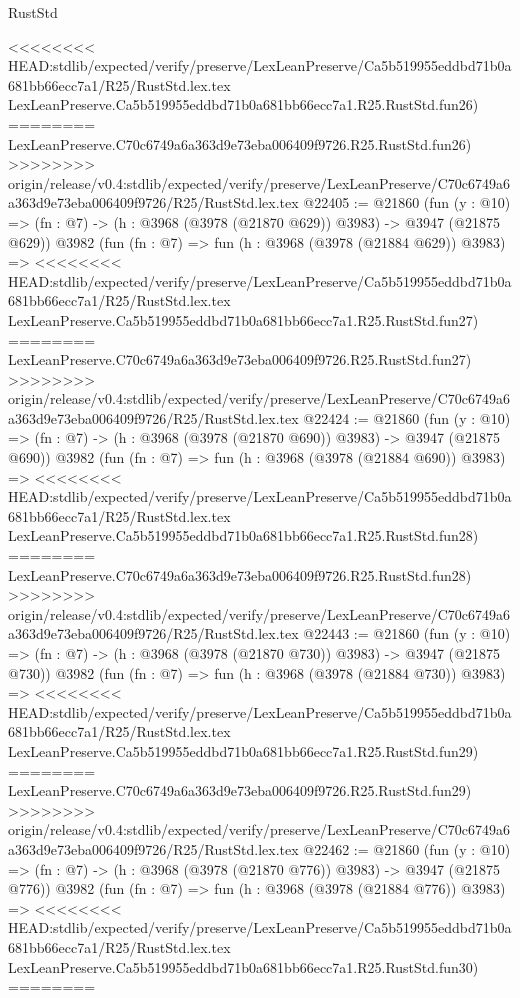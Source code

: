 \begin{lexlean}{RustStd}
\begin{coremodule}
{\begin{coremodule}
{{{{{{{{{{{{{{{{{{{{{{{{{{{{{{{{{{{{{{<<<<<<<< HEAD:stdlib/expected/verify/preserve/LexLeanPreserve/Ca5b519955eddbd71b0a681bb66ecc7a1/R25/RustStd.lex.tex
    LexLeanPreserve.Ca5b519955eddbd71b0a681bb66ecc7a1.R25.RustStd.fun26)
========
    LexLeanPreserve.C70c6749a6a363d9e73eba006409f9726.R25.RustStd.fun26)
>>>>>>>> origin/release/v0.4:stdlib/expected/verify/preserve/LexLeanPreserve/C70c6749a6a363d9e73eba006409f9726/R25/RustStd.lex.tex
@22405 := @21860
    (fun (y : @10) => (fn : @7) -> (h : @3968 (@3978 (@21870 @629)) @3983) -> @3947 (@21875 @629))
    @3982
    (fun (fn : @7) =>
    fun (h : @3968 (@3978 (@21884 @629)) @3983) =>
<<<<<<<< HEAD:stdlib/expected/verify/preserve/LexLeanPreserve/Ca5b519955eddbd71b0a681bb66ecc7a1/R25/RustStd.lex.tex
    LexLeanPreserve.Ca5b519955eddbd71b0a681bb66ecc7a1.R25.RustStd.fun27)
========
    LexLeanPreserve.C70c6749a6a363d9e73eba006409f9726.R25.RustStd.fun27)
>>>>>>>> origin/release/v0.4:stdlib/expected/verify/preserve/LexLeanPreserve/C70c6749a6a363d9e73eba006409f9726/R25/RustStd.lex.tex
@22424 := @21860
    (fun (y : @10) => (fn : @7) -> (h : @3968 (@3978 (@21870 @690)) @3983) -> @3947 (@21875 @690))
    @3982
    (fun (fn : @7) =>
    fun (h : @3968 (@3978 (@21884 @690)) @3983) =>
<<<<<<<< HEAD:stdlib/expected/verify/preserve/LexLeanPreserve/Ca5b519955eddbd71b0a681bb66ecc7a1/R25/RustStd.lex.tex
    LexLeanPreserve.Ca5b519955eddbd71b0a681bb66ecc7a1.R25.RustStd.fun28)
========
    LexLeanPreserve.C70c6749a6a363d9e73eba006409f9726.R25.RustStd.fun28)
>>>>>>>> origin/release/v0.4:stdlib/expected/verify/preserve/LexLeanPreserve/C70c6749a6a363d9e73eba006409f9726/R25/RustStd.lex.tex
@22443 := @21860
    (fun (y : @10) => (fn : @7) -> (h : @3968 (@3978 (@21870 @730)) @3983) -> @3947 (@21875 @730))
    @3982
    (fun (fn : @7) =>
    fun (h : @3968 (@3978 (@21884 @730)) @3983) =>
<<<<<<<< HEAD:stdlib/expected/verify/preserve/LexLeanPreserve/Ca5b519955eddbd71b0a681bb66ecc7a1/R25/RustStd.lex.tex
    LexLeanPreserve.Ca5b519955eddbd71b0a681bb66ecc7a1.R25.RustStd.fun29)
========
    LexLeanPreserve.C70c6749a6a363d9e73eba006409f9726.R25.RustStd.fun29)
>>>>>>>> origin/release/v0.4:stdlib/expected/verify/preserve/LexLeanPreserve/C70c6749a6a363d9e73eba006409f9726/R25/RustStd.lex.tex
@22462 := @21860
    (fun (y : @10) => (fn : @7) -> (h : @3968 (@3978 (@21870 @776)) @3983) -> @3947 (@21875 @776))
    @3982
    (fun (fn : @7) =>
    fun (h : @3968 (@3978 (@21884 @776)) @3983) =>
<<<<<<<< HEAD:stdlib/expected/verify/preserve/LexLeanPreserve/Ca5b519955eddbd71b0a681bb66ecc7a1/R25/RustStd.lex.tex
    LexLeanPreserve.Ca5b519955eddbd71b0a681bb66ecc7a1.R25.RustStd.fun30)
========
}}}}}}}}}}}}}}}}}}}}}}}}}}}}}}}}}}}}}}
\end{coremodule}}
\end{coremodule}
\end{lexlean}

